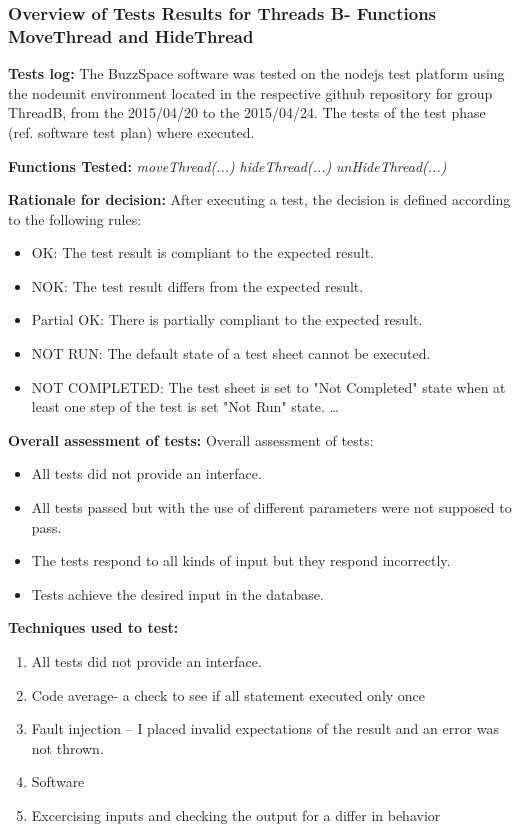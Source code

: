 \begin{flushleft}
\begin{flushleft}
\end{flushleft}

\subsubsection{Overview of Tests Results for Threads B- Functions MoveThread and HideThread}
\begin{flushleft}
\textbf{Tests log:}
The BuzzSpace software was tested on the nodejs test platform using the nodeunit environment located in the respective github repository for group ThreadB, from the 2015/04/20 to the 2015/04/24. The tests of the test phase (ref. software test plan) where executed.


\textbf{Functions Tested:}
\emph{moveThread(...)} 
\emph{hideThread(...)} 
\emph{unHideThread(...)} 

\textbf{Rationale for decision:}
After executing a test, the decision is defined according to the following rules:
\begin{itemize}
  \item OK: The test result is compliant to the expected result.
  \item 	NOK: The test result differs from the expected result.
   \item Partial OK: There is partially compliant to the expected result. 
    \item NOT RUN: The default state of a test sheet cannot be executed.
  \item NOT COMPLETED: The test sheet is set to "Not Completed" state when at least one step of the test is set "Not Run" state. \ldots
\end{itemize}

\textbf{Overall assessment of tests:}
Overall assessment of tests:
\begin{itemize}
  \item All tests did not provide an interface.
  \item 	All tests passed but with the use of different parameters were not supposed to pass.
   \item The tests respond to all kinds of input but they respond incorrectly.
    \item Tests achieve the desired input in the database. 
 \end{itemize}

\textbf{Techniques used to test:}
\begin{enumerate}
  \item All tests did not provide an interface.
  \item Code average- a check to see if all statement executed only once
   \item Fault injection – I placed invalid expectations of the result and an error was not thrown.
    \item Software 
     \item Excercising inputs and checking the output for a differ in behavior
 \end{enumerate}


\end{flushleft}
\end{flushleft}
